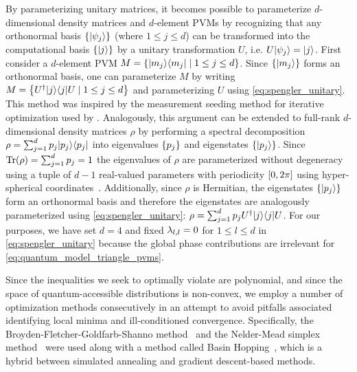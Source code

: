 \documentclass[aps, 10pt, english, twoside, pra, nofootinbib, tightenlines, longbibliography, superscriptaddress]{revtex4-1}
\begin{document}
    By parameterizing unitary matrices, it becomes possible to parameterize $d$-dimensional density matrices and $d$-element PVMs by recognizing that any orthonormal basis $\bc{\ket{\psi_j}}$ (where $1 \leq j \leq d$) can be transformed into the computational basis $\bc{\ket{j}}$ by a unitary transformation $U$, i.e. $U \ket{\psi_j} = \ket{j}$. First consider a $d$-element PVM $M = \bc{\ket{m_j}\bra{m_j} \mid 1 \leq j \leq d}$. Since $\bc{\ket{m_j}}$ forms an orthonormal basis, one can parameterize $M$ by writing $M = \bc{U^{\dagger}\ket{j}\bra{j}U \mid 1 \leq j \leq d}$ and parameterizing $U$ using \cref{eq:spengler_unitary}. This method was inspired by the measurement seeding method for iterative optimization used by \citet{Pal_2010}. Analogously, this argument can be extended to full-rank $d$-dimensional density matrices $\rho$ by performing a spectral decomposition $\rho = \sum_{j=1}^{d} p_j \ket{p_j} \bra{p_j}$ into eigenvalues $\bc{p_j}$ and eigenstates $\bc{\ket{p_j}}$. Since $\Tr\br{\rho} = \sum_{j = 1}^{d} p_j = 1$ the eigenvalues of $\rho$ are parameterized without degeneracy using a tuple of $d-1$ real-valued parameters with periodicity $\bs{0, 2 \pi}$ using hyper-spherical coordinates~\cite{Hedemann_2013, Spengler_2010_Unitary}. Additionally, since $\rho$ is Hermitian, the eigenstates $\bc{\ket{p_j}}$ form an orthonormal basis and therefore the eigenstates are analogously parameterized using \cref{eq:spengler_unitary}: $\rho = \sum_{j=1}^{d} p_j U^{\dagger} \ket{j} \bra{j} U$. For our purposes, we have set $d = 4$ and fixed $\lambda_{l, l} = 0$ for $1 \leq l \leq d$ in \cref{eq:spengler_unitary} because the global phase contributions are irrelevant for \cref{eq:quantum_model_triangle_pvms}.

    Since the inequalities we seek to optimally violate are polynomial, and since the space of quantum-accessible distributions is non-convex, we employ a number of optimization methods consecutively in an attempt to avoid pitfalls associated identifying local minima and ill-conditioned convergence. Specifically, the Broyden-Fletcher-Goldfarb-Shanno method~\cite[p.142]{Nocedal_2000} and the Nelder-Mead simplex method~\cite[p.238]{Nocedal_2000} were used along with a method called Basin Hopping~\cite{Wales_1997}, which is a hybrid between simulated annealing and gradient descent-based methods.
\end{document}
